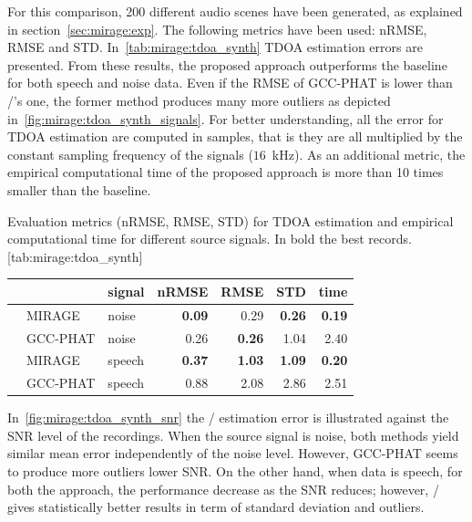 \label{subsec:eval_synth_tdoa}
For this comparison, 200 different audio scenes have been generated, as explained in section~\cref{sec:mirage:exp}.
The following metrics have been used: \ac{nRMSE}, \ac{RMSE} and \ac{STD}.
In~\cref{tab:mirage:tdoa_synth} TDOA estimation errors are presented.
From these results, the proposed approach outperforms the baseline for both speech and noise data.
Even if the \ac{RMSE} of \ac{GCC-PHAT} is lower than \MIRAGE/'s one, the former method produces many more outliers as depicted in~\cref{fig:mirage:tdoa_synth_signals}.
For better understanding, all the error for \ac{TDOA} estimation are computed in samples, that is they are all multiplied by the constant sampling frequency of the signals ($16$~kHz).
As an additional metric, the empirical computational time of the proposed approach is more than 10 times smaller than the baseline.
\begin{table}[h]
    \begin{sidecaption}[]{
        Evaluation metrics (nRMSE, RMSE, STD) for TDOA estimation and empirical computational time for different source signals. In bold the best records.
    }[tab:mirage:tdoa_synth]
        \small
        \centering
        \begin{tabular*}{\linewidth}{@{\extracolsep{\fill}}lllrrrr@{}}
        \toprule
        &           &  signal &     nRMSE &       RMSE &       STD &      time \\
        \midrule
        & MIRAGE      &   noise &  \textbf{0.09} &  0.29 &  \textbf{0.26} &  \textbf{0.19} \\
        & GCC-PHAT    &   noise &  0.26 &  \textbf{0.26} &  1.04 &  2.40 \\
        \midrule
        & MIRAGE      &  speech &  \textbf{0.37} &  \textbf{1.03} &  \textbf{1.09} &  \textbf{0.20} \\
        & GCC-PHAT    &  speech &  0.88 &  2.08 &  2.86 &  2.51 \\
        \bottomrule
    \end{tabular*}
    \end{sidecaption}
\end{table}

\mynewline
In~\cref{fig:mirage:tdoa_synth_snr} the \TDOA/ estimation error is illustrated against the \ac{SNR} level of the recordings.
When the source signal is noise, both methods yield similar mean error independently of the noise level.
However, \ac{GCC-PHAT} seems to produce more outliers lower \ac{SNR}.
On the other hand, when data is speech, for both the approach, the performance decrease as the SNR reduces; however, \MIRAGE/ gives statistically better results in term of standard deviation and outliers.

